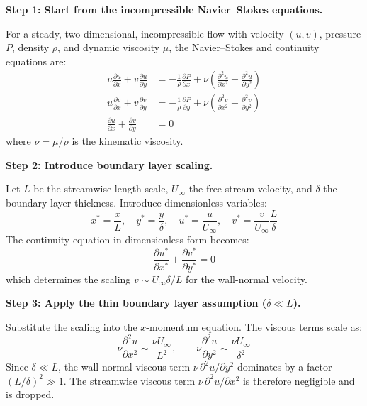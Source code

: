 \documentclass[11pt,openright]{book}
\begin{document}
\textbf{Step 1: Start from the incompressible Navier--Stokes equations.}

For a steady, two-dimensional, incompressible flow with velocity $(u, v)$, pressure $P$, density $\rho$, and dynamic viscosity $\mu$, the Navier--Stokes and continuity equations are:
\begin{align}
u\frac{\partial u}{\partial x} + v\frac{\partial u}{\partial y} &= -\frac{1}{\rho}\frac{\partial P}{\partial x} + \nu\left(\frac{\partial^2 u}{\partial x^2} + \frac{\partial^2 u}{\partial y^2}\right) \\
u\frac{\partial v}{\partial x} + v\frac{\partial v}{\partial y} &= -\frac{1}{\rho}\frac{\partial P}{\partial y} + \nu\left(\frac{\partial^2 v}{\partial x^2} + \frac{\partial^2 v}{\partial y^2}\right) \\
\frac{\partial u}{\partial x} + \frac{\partial v}{\partial y} &= 0
\end{align}
where $\nu = \mu/\rho$ is the kinematic viscosity.

\textbf{Step 2: Introduce boundary layer scaling.}

Let $L$ be the streamwise length scale, $U_\infty$ the free-stream velocity, and $\delta$ the boundary layer thickness. Introduce dimensionless variables:
\begin{equation}
x^* = \frac{x}{L},\quad y^* = \frac{y}{\delta},\quad u^* = \frac{u}{U_\infty},\quad v^* = \frac{v}{U_\infty}\frac{L}{\delta}
\end{equation}
The continuity equation in dimensionless form becomes:
\begin{equation}
\frac{\partial u^*}{\partial x^*} + \frac{\partial v^*}{\partial y^*} = 0
\end{equation}
which determines the scaling $v \sim U_\infty \delta / L$ for the wall-normal velocity.

\textbf{Step 3: Apply the thin boundary layer assumption ($\delta \ll L$).}

Substitute the scaling into the $x$-momentum equation. The viscous terms scale as:
\begin{equation}
\nu\frac{\partial^2 u}{\partial x^2} \sim \frac{\nu U_\infty}{L^2},\qquad \nu\frac{\partial^2 u}{\partial y^2} \sim \frac{\nu U_\infty}{\delta^2}
\end{equation}
Since $\delta \ll L$, the wall-normal viscous term $\nu\,\partial^2 u/\partial y^2$ dominates by a factor $(L/\delta)^2 \gg 1$. The streamwise viscous term $\nu\,\partial^2 u/\partial x^2$ is therefore negligible and is dropped.
\end{document}
